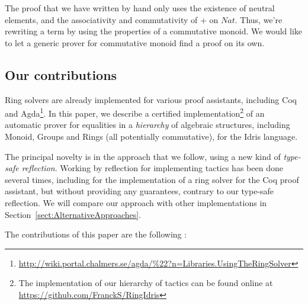 The proof that we have written by hand only uses the existence of neutral elements, and the associativity and commutativity of $+$ on $Nat$. Thus, we're rewriting a term by using the properties of a commutative monoid. We would like to let a generic prover for commutative monoid find a proof on its own.

\subsection{Our contributions}

Ring solvers are already implemented for various proof
assistants, including Coq~\cite{Coq2005} and Agda\footnote{\url{http://wiki.portal.chalmers.se/agda/\%22?n=Libraries.UsingTheRingSolver}}. 
In this paper, we describe a certified
implementation\footnote{The implementation of our hierarchy of tactics can be found online at \url{https://github.com/FranckS/RingIdris}} of an automatic prover for equalities in a \emph{hierarchy} of algebraic
structures, including Monoid, Groups and Rings (all potentially commutative),
for the Idris language. 

The principal novelty is in the approach that we follow, using a
new kind of \emph{type-safe reflection}.  Working by reflection for implementing tactics has been done several times, including for the implementation of a ring solver for the Coq proof assistant, but without
providing any guarantees, contrary to our type-safe reflection. We will
compare our approach with other implementations in Section~\ref{sect:AlternativeApproaches}.

The contributions of this paper are the following :

